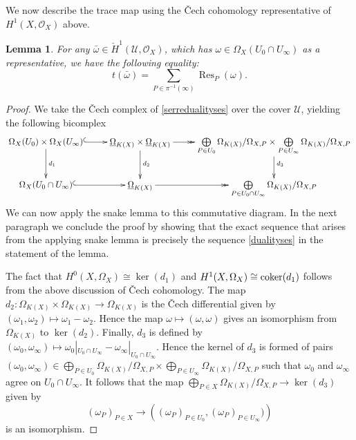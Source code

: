 \documentclass[draft, 11pt]{article} %
\theoremstyle{plain}
\newtheorem{lem}[defn]{Lemma}
\theoremstyle{remark}
\newcommand{\ra}{\rightarrow}
\newcommand{\cU}{{\mathcal U}}
\newcommand{\cech}{\v{C}ech }
\newcommand{\hone}{H^1(X,\mathcal{O}_X)}
\newcommand{\cechhone}{\check{H}^1(\mathcal U,\mathcal O_X)}
\DeclareMathOperator{\res}{Res}
\begin{document}
We now describe the trace map using the \cech cohomology representative of $\hone$ above.
\begin{lem}\label{tracemaplemma}
For any $\bar \omega \in \cechhone$, which has $\omega \in \Omega_X(U_0 \cap U_\infty)$ as a representative, we have the following equality:
\[
t(\bar \omega) = \sum_{P \in \pi^{-1}(\infty)}\res_P(\omega).
\]
\end{lem}
\begin{proof}
We take the \cech complex of \eqref{serredualityses} over the cover $\cU$, yielding the following bicomplex
\begin{equation}\label{dualitydiagram2}
\xymatrix{\Omega_X(U_0)\times\Omega_X(U_\infty) \ar@{^{(}->}[r] \ar[d]^{d_1} & \underline{\Omega}_{K(X)} \times \underline{\Omega}_{K(X)} \ar[d]^{d_2} \ar@{->>}[r] & \bigoplus \limits_{P \in U_0} \Omega_{K(X)}/\Omega_{X,P} \times \bigoplus \limits_{P \in U_\infty} \Omega_{K(X)}/\Omega_{X,P} \ar[d]^{d_3} \\
\Omega_X(U_0 \cap U_\infty) \ar@{^{(}->}[r]  & \underline{\Omega}_{K(X)} \ar@{->>}[r] & \bigoplus \limits_{P\in U_0 \cap U_\infty} \Omega_{K(X)}/\Omega_{X,P} }
\end{equation}
We can now apply the snake lemma to this commutative diagram.
In the next paragraph we conclude the proof by showing that the exact sequence that arises from the applying snake lemma is precisely the sequence \eqref{dualityses} in the statement of the lemma.

The fact that $H^0(X,\Omega_X) \cong \ker(d_1)$ and $H^1(X,\Omega_X) \cong {\rm coker}(d_1)$ follows from the above discussion of \cech cohomology.
The map $d_2\colon \Omega_{K(X)} \times \Omega_{K(X)} \ra \Omega_{K(X)}$ is the \cech differential given by $(\omega_1,\omega_2) \mapsto \omega_1 - \omega_2$.
Hence the map $\omega \mapsto (\omega, \omega)$ gives an isomorphism from $\Omega_{K(X)}$ to $\ker(d_2)$.
Finally, $d_3$ is defined by $(\omega_0, \omega_\infty) \mapsto \omega_0|_{U_0 \cap U_\infty} - \omega_\infty|_{U_0 \cap U_\infty}$.
Hence the kernel of $d_3$ is formed of pairs $(\omega_0, \omega_\infty) \in \bigoplus_{P \in U_0} \Omega_{K(X)}/\Omega_{X,P} \times \bigoplus_{P \in  U_\infty} \Omega_{K(X)}/\Omega_{X,P}$ such that $\omega_0$ and $\omega_\infty$ agree on $U_0 \cap U_\infty$.
It follows that the map $\bigoplus_{P \in X} \Omega_{K(X)}/\Omega_{X,P}\ra\ker(d_3)  $ given by 
\begin{equation*}
(\omega_P)_{P \in X} \to \left( (\omega_P)_{ P \in U_0}, (\omega_P)_{P \in U_\infty}) \right)
\end{equation*}
is an isomorphism.


\end{proof}
\end{document}
